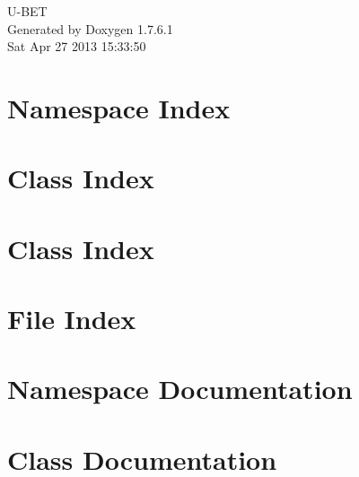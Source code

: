 \documentclass[a4paper]{book}
\begin{document}
\hypersetup{pageanchor=false,citecolor=blue}
\begin{titlepage}
\vspace*{7cm}
\begin{center}
{\Large \-U-\/\-B\-E\-T }\\
\vspace*{1cm}
{\large \-Generated by Doxygen 1.7.6.1}\\
\vspace*{0.5cm}
{\small Sat Apr 27 2013 15:33:50}\\
\end{center}
\end{titlepage}
\clearemptydoublepage
{}
\tableofcontents
\clearemptydoublepage
{}
\hypersetup{pageanchor=true,citecolor=blue}
\chapter{\-Namespace \-Index}

\chapter{\-Class \-Index}

\chapter{\-Class \-Index}

\chapter{\-File \-Index}

\chapter{\-Namespace \-Documentation}



\chapter{\-Class \-Documentation}






















\end{document}
